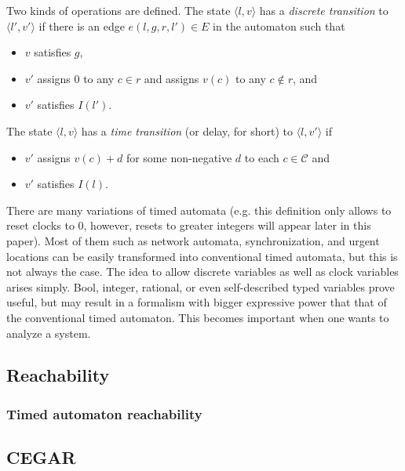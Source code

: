Two kinds of operations are defined. The state $\langle l,v \rangle$ has a
\emph{discrete transition} to $\langle l',v' \rangle$  if there is an
edge $e(l,g,r,l') \in E$ in the automaton such that 
\begin{itemize}
	\item $v$ satisfies $g$, 
	\item $v'$ assigns 0 to any $c \in r$ and assigns $v(c)$ to any $c \not\in r$, and
	\item $v'$ satisfies $I(l')$. 
\end{itemize}
The state $\langle l,v \rangle$ has a \emph{time transition} (or delay, for short) to $\langle l,v' \rangle$ if
\begin{itemize}
	\item $v'$ assigns $v(c)+d$ for some non-negative $d$ to each $c \in \mathcal{C}$ and
	\item $v'$ satisfies $I(l)$. 
\end{itemize}


There are many variations of timed automata (e.g. this definition only allows to reset clocks to 0, however, resets to greater integers will appear later in this paper). Most of them such as network automata, synchronization, and urgent locations can be easily transformed into conventional timed automata, but this is not always the case. The idea to allow discrete variables as well as clock variables arises simply. Bool, integer, rational, or even self-described typed variables prove useful, but may result in a formalism with bigger expressive power that that of the conventional timed automaton. This becomes important when one wants to analyze a system.


\subsection{Reachability}


\subsubsection{Timed automaton reachability} \label{sec:tareach}


\subsection{CEGAR}
